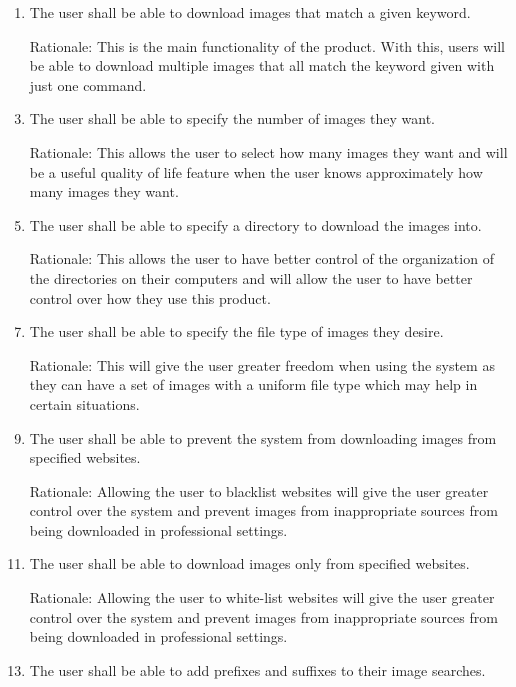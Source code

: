 \documentclass[12pt, titlepage]{article}
\begin{document}
\begin{enumerate}[label=FR\arabic*:, wide=0pt, leftmargin=*]
    \item The user shall be able to download images that match a given keyword.
    \item[Rationale:] This is the main functionality of the product. With this, users will be able to download multiple images that all match the keyword given with just one command.
    \\
    \item The user shall be able to specify the number of images they want.
    \item[Rationale:] This allows the user to select how many images they want and will be a useful quality of life feature when the user knows approximately how many images they want.
    \\
    \item The user shall be able to specify a directory to download the images into.
    \item[Rationale:] This allows the user to have better control of the organization of the directories on their computers and will allow the user to have better control over how they use this product.
    \\
    \item The user shall be able to specify the file type of images they desire.
    \item[Rationale:] This will give the user greater freedom when using the system as they can have a set of images with a uniform file type which may help in certain situations.
    \\
    \item The user shall be able to prevent the system from downloading images from specified websites.
    \item[Rationale:] Allowing the user to blacklist websites will give the user greater control over the system and prevent images from inappropriate sources from being downloaded in professional settings. 
    \\
    \item The user shall be able to download images only from specified websites.
    \item[Rationale:] Allowing the user to white-list websites will give the user greater control over the system and prevent images from inappropriate sources from being downloaded in professional settings. 
    \\
    \item The user shall be able to add prefixes and suffixes to their image searches.

\end{enumerate}
\end{document}
